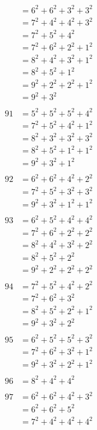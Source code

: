 \documentclass{article}
\numberwithin{equation}{section}
\begin{document}
\begin{multicols}{3}
\begin{align*}
   & = 6^2 + 6^2 + 3^2 + 3^2\\
   & = 7^2 + 4^2 + 4^2 + 3^2\\
   & = 7^2 + 5^2 + 4^2\\
   & = 7^2 + 6^2 + 2^2 + 1^2\\
   & = 8^2 + 4^2 + 3^2 + 1^2\\
   & = 8^2 + 5^2 + 1^2\\
   & = 9^2 + 2^2 + 2^2 + 1^2\\
   & = 9^2 + 3^2\\
\\
91 & = 5^2 + 5^2 + 5^2 + 4^2\\
   & = 7^2 + 5^2 + 4^2 + 1^2\\
   & = 8^2 + 3^2 + 3^2 + 3^2\\
   & = 8^2 + 5^2 + 1^2 + 1^2\\
   & = 9^2 + 3^2 + 1^2\\
\\
92 & = 6^2 + 6^2 + 4^2 + 2^2\\
   & = 7^2 + 5^2 + 3^2 + 3^2\\
   & = 9^2 + 3^2 + 1^2 + 1^2\\
\\
93 & = 6^2 + 5^2 + 4^2 + 4^2\\
   & = 7^2 + 6^2 + 2^2 + 2^2\\
   & = 8^2 + 4^2 + 3^2 + 2^2\\
   & = 8^2 + 5^2 + 2^2\\
   & = 9^2 + 2^2 + 2^2 + 2^2\\
\\
94 & = 7^2 + 5^2 + 4^2 + 2^2\\
   & = 7^2 + 6^2 + 3^2\\
   & = 8^2 + 5^2 + 2^2 + 1^2\\
   & = 9^2 + 3^2 + 2^2\\
\\
95 & = 6^2 + 5^2 + 5^2 + 3^2\\
   & = 7^2 + 6^2 + 3^2 + 1^2\\
   & = 9^2 + 3^2 + 2^2 + 1^2\\
\end{align*}
\vspace{\fill}\columnbreak
\noindent
\begin{align*}
96 & = 8^2 + 4^2 + 4^2\\
\\
97 & = 6^2 + 6^2 + 4^2 + 3^2\\
   & = 6^2 + 6^2 + 5^2\\
   & = 7^2 + 4^2 + 4^2 + 4^2\\

\end{align*}
\end{multicols}
\end{document}
